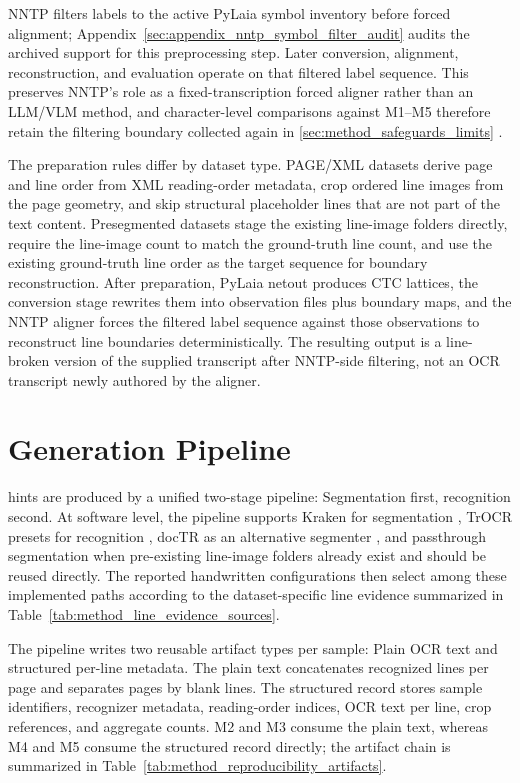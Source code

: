 NNTP filters labels to the active PyLaia symbol inventory before forced alignment; Appendix~\ref{sec:appendix_nntp_symbol_filter_audit} audits the archived support for this preprocessing step. Later conversion, alignment, reconstruction, and evaluation operate on that filtered label sequence. This preserves NNTP's role as a fixed-transcription forced aligner rather than an LLM/VLM method, and character-level comparisons against M1--M5 therefore retain the filtering boundary collected again in \autoref{sec:method_safeguards_limits} .

The preparation rules differ by dataset type. PAGE/XML datasets derive page and line order from XML reading-order metadata, crop ordered line images from the page geometry, and skip structural placeholder lines that are not part of the text content. Presegmented datasets stage the existing line-image folders directly, require the line-image count to match the ground-truth line count, and use the existing ground-truth line order as the target sequence for boundary reconstruction. After preparation, PyLaia netout produces CTC lattices, the conversion stage rewrites them into observation files plus boundary maps, and the NNTP aligner forces the filtered label sequence against those observations to reconstruct line boundaries deterministically. The resulting output is a line-broken version of the supplied transcript after NNTP-side filtering, not an OCR transcript newly authored by the aligner.

\section{\OCRHTR Generation Pipeline}
\label{sec:method_ocr_htr_pipeline}

\OCRHTR hints are produced by a unified two-stage pipeline: Segmentation first, recognition second. At software level, the pipeline supports Kraken for segmentation , TrOCR presets for recognition , docTR as an alternative segmenter , and passthrough segmentation when pre-existing line-image folders already exist and should be reused directly. The reported handwritten configurations then select among these implemented paths according to the dataset-specific line evidence summarized in Table~\ref{tab:method_line_evidence_sources}.

The pipeline writes two reusable artifact types per sample: Plain OCR text and structured per-line metadata. The plain text concatenates recognized lines per page and separates pages by blank lines. The structured record stores sample identifiers, recognizer metadata, reading-order indices, OCR text per line, crop references, and aggregate counts. M2 and M3 consume the plain text, whereas M4 and M5 consume the structured record directly; the artifact chain is summarized in Table~\ref{tab:method_reproducibility_artifacts}.

